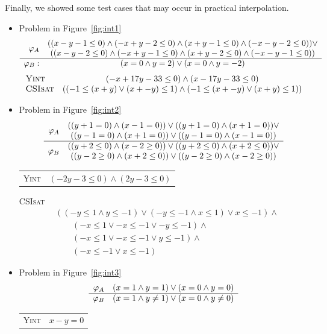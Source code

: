 Finally, we showed some test cases that may occur in practical interpolation.
\begin{itemize}
\item Problem in Figure~\ref{fig:int1}
\[\begin{array}{r c}
\multirow{2}{*}{$\varphi_A$}
& ((x-y-1 \leq 0) \wedge (-x+y-2 \leq 0) \wedge (x+y-1 \leq 0) \wedge (-x-y-2 \leq 0)) \vee \\
& ((x-y-2 \leq 0) \wedge (-x+y-1 \leq 0) \wedge (x+y-2 \leq 0) \wedge (-x-y-1 \leq 0)) \\
\hline
\varphi_B : & (x=0 \wedge y=2) \vee (x=0 \wedge y=-2)
\end{array}\]
\[\begin{array}{l c}
\text{\textsc{Yint}} & (-x+17y-33 \leq 0) \wedge (x-17y-33 \leq 0) \\
\text{\textsc{CSIsat}} & ((-1 \leq (x + y) \vee (x + -y) \leq 1) \wedge (-1 \leq (x + -y) \vee (x + y) \leq 1))
\end{array}\]

\item Problem in Figure~\ref{fig:int2}
\[\begin{array}{r c}
\multirow{2}{*}{$\varphi_A$}
& ((y+1=0) \wedge (x-1=0)) \vee ((y+1=0) \wedge (x+1=0)) \vee \\
& ((y-1=0) \wedge (x+1=0)) \vee ((y-1=0) \wedge (x-1=0)) \\
\hline
\multirow{2}{*}{$\varphi_B$}
& ((y+2 \leq 0) \wedge (x-2 \geq 0)) \vee ((y+2 \leq 0) \wedge (x+2 \leq 0)) \vee \\
& ((y-2 \geq 0) \wedge (x+2 \leq 0)) \vee ((y-2 \geq 0) \wedge (x-2 \geq 0))
\end{array}\]
\begin{tabular}{l c}
\textsc{Yint} & $(-2y-3 \leq 0) \wedge (2y-3 \leq 0)$
\end{tabular}

\textsc{CSIsat}
\begin{align*}
& ((-y \leq 1 \wedge y \leq -1) \vee (-y \leq -1 \wedge x \leq 1) \vee x \leq -1) \wedge \\
& \qquad (-x \leq 1 \vee -x \leq -1 \vee -y \leq -1) \wedge \\
& \qquad (-x \leq 1 \vee -x \leq -1 \vee y \leq -1) \wedge \\
& \qquad (-x \leq -1 \vee x \leq -1)
\end{align*}

\item Problem in Figure~\ref{fig:int3}
\[\begin{array}{r c}
\varphi_A & (x=1 \wedge y=1) \vee (x=0 \wedge y=0) \\
\hline
\varphi_B & (x=1 \wedge y \neq 1) \vee (x=0 \wedge y \neq 0)
\end{array}\]
\begin{tabular}{l c}
\textsc{Yint} & $x-y=0$
\end{tabular}


\end{itemize}
